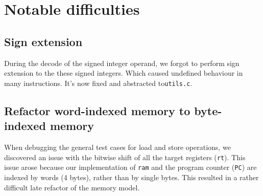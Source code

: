 \documentclass[11pt]{article}
\begin{document}
\section{Notable difficulties}

\subsection{Sign extension}
During the decode of the signed integer operand, we forgot to perform sign
extension to the these signed integers. Which caused undefined behaviour in
many instructions. It's now fixed and abstracted to\texttt{utils.c}.

\subsection{Refactor word-indexed memory to byte-indexed memory}
When debugging the general test cases for load and store operations, we
discovered an issue with the bitwise shift of all the target registers
(\texttt{rt}). This issue arose because our implementation of \texttt{ram} and
the program counter (\texttt{PC}) are indexed by words (4 bytes), rather than
by single bytes. This resulted in a rather difficult late refactor of the
memory model.
\end{document}

